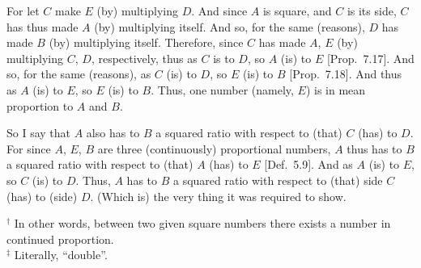 \begin{Parallel}{}{}
{For let $C$ make $E$ (by) multiplying $D$. And since $A$ is square, and $C$ is its side, $C$ has thus made $A$ (by) multiplying
itself. And so, for the same (reasons), $D$ has made $B$ (by) multiplying
itself. Therefore, since $C$ has made  $A$, $E$ (by) multiplying
$C$, $D$, respectively, thus as $C$ is to $D$, so $A$ (is) to $E$ [Prop.~7.17]. And so, for the same (reasons), 
as $C$ (is) to $D$, so $E$ (is) to $B$  [Prop.~7.18]. And thus as $A$ (is) to $E$, so
$E$ (is) to $B$. Thus,  one  number (namely, $E$) is in mean proportion to $A$ and $B$.

So I say that $A$ also has to $B$ a squared ratio with respect to (that)
$C$ (has) to $D$. For since $A$, $E$, $B$ are  three (continuously) proportional numbers, $A$ thus has to $B$ a squared ratio with
respect to (that) $A$ (has) to $E$ [Def.~5.9]. And
as $A$ (is) to $E$, so $C$ (is) to $D$. Thus, $A$ has to $B$ a squared ratio
with respect to (that) side $C$ (has) to (side) $D$. (Which is) the very thing it
was required to show.}
\end{Parallel}
{\footnotesize\noindent$^\dag$ In other words, between two given square numbers there
exists a number in continued proportion.\\[0.5ex]
$^\ddag$ Literally, ``double''.}

